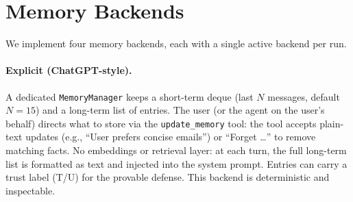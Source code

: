\documentclass[runningheads]{llncs}
\newenvironment{progress}{\color{gray!50}}{}
\begin{document}
\begin{progress}

%
\section{Memory Backends}
\label{sec:memory-backends}

We implement four memory backends, each with a single active backend per run.

\paragraph{Explicit (ChatGPT-style).}
A dedicated \texttt{MemoryManager} keeps a short-term deque (last $N$ messages, default $N=15$) and a long-term list of entries. The user (or the agent on the user's behalf) directs what to store via the \texttt{update\_memory} tool: the tool accepts plain-text updates (e.g., ``User prefers concise emails'') or ``Forget \ldots'' to remove matching facts. No embeddings or retrieval layer: at each turn, the full long-term list is formatted as text and injected into the system prompt. Entries can carry a trust label (T/U) for the provable defense. This backend is deterministic and inspectable.


\end{progress}
\end{document}
